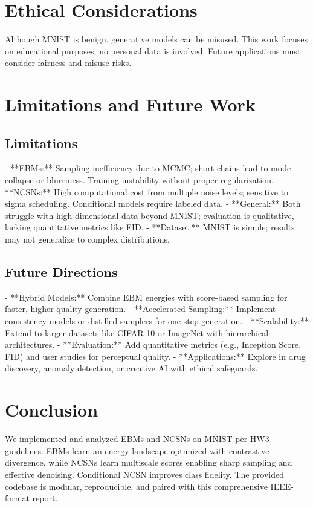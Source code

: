 \documentclass[a4paper,12pt]{article}
\begin{document}
\section{Ethical Considerations}
Although MNIST is benign, generative models can be misused. This work focuses on educational purposes; no personal data is involved. Future applications must consider fairness and misuse risks.

\section{Limitations and Future Work}
\subsection{Limitations}
- **EBMs:** Sampling inefficiency due to MCMC; short chains lead to mode collapse or blurriness. Training instability without proper regularization.
- **NCSNs:** High computational cost from multiple noise levels; sensitive to sigma scheduling. Conditional models require labeled data.
- **General:** Both struggle with high-dimensional data beyond MNIST; evaluation is qualitative, lacking quantitative metrics like FID.
- **Dataset:** MNIST is simple; results may not generalize to complex distributions.

\subsection{Future Directions}
- **Hybrid Models:** Combine EBM energies with score-based sampling for faster, higher-quality generation.
- **Accelerated Sampling:** Implement consistency models or distilled samplers for one-step generation.
- **Scalability:** Extend to larger datasets like CIFAR-10 or ImageNet with hierarchical architectures.
- **Evaluation:** Add quantitative metrics (e.g., Inception Score, FID) and user studies for perceptual quality.
- **Applications:** Explore in drug discovery, anomaly detection, or creative AI with ethical safeguards.

\section{Conclusion}
We implemented and analyzed EBMs and NCSNs on MNIST per HW3 guidelines. EBMs learn an energy landscape optimized with contrastive divergence, while NCSNs learn multiscale scores enabling sharp sampling and effective denoising. Conditional NCSN improves class fidelity. The provided codebase is modular, reproducible, and paired with this comprehensive IEEE-format report.
\end{document}
